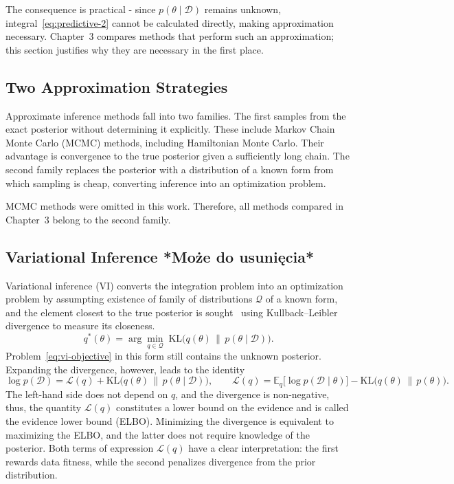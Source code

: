 The consequence is practical - since $p(\theta \mid \mathcal{D})$ remains unknown,
integral~\eqref{eq:predictive-2} cannot be calculated directly, making approximation
necessary. Chapter~3 compares methods that perform such an approximation; this section
justifies why they are necessary in the first place.

\subsection{Two Approximation Strategies}
\label{subsec:mcmc-vs-vi}

Approximate inference methods fall into two families. The first samples from the exact
posterior without determining it explicitly. These include Markov Chain Monte Carlo
(MCMC) methods, including Hamiltonian Monte Carlo. Their advantage is convergence to the
true posterior given a sufficiently long chain. The second family replaces the posterior
with a distribution of a known form from which sampling is cheap, converting inference into
an optimization problem.

MCMC methods were omitted in this work. Therefore, all methods compared in Chapter~3 belong to the second
family.

\subsection{Variational Inference *Może do usunięcia*}
\label{subsec:variational-inference}

Variational inference (VI) converts the integration problem into an optimization problem by assumpting existence of family of distributions $\mathcal{Q}$ of a known form, and the element
closest to the true posterior is sought~\cite{blei2017} using Kullback--Leibler divergence to measure its closeness.
%
\begin{equation}
    q^\ast(\theta)
    = \arg\min_{q \in \mathcal{Q}}\;
      \mathrm{KL}\bigl(q(\theta) \,\|\, p(\theta \mid \mathcal{D})\bigr) .
    \label{eq:vi-objective}
\end{equation}
%
Problem~\eqref{eq:vi-objective} in this form still contains the unknown posterior.
Expanding the divergence, however, leads to the identity
%
\begin{equation}
    \log p(\mathcal{D})
    = \mathcal{L}(q) + \mathrm{KL}\bigl(q(\theta) \,\|\, p(\theta \mid \mathcal{D})\bigr),
    \qquad 
    \mathcal{L}(q)
    = \mathbb{E}_{q}\bigl[\log p(\mathcal{D} \mid \theta)\bigr]
      - \mathrm{KL}\bigl(q(\theta) \,\|\, p(\theta)\bigr) .
    \label{eq:elbo}
\end{equation}
%
The left-hand side does not depend on $q$, and the divergence is non-negative, thus, the
quantity $\mathcal{L}(q)$ constitutes a lower bound on the evidence and is called the
evidence lower bound (ELBO). Minimizing the divergence is equivalent to maximizing the
ELBO, and the latter does not require knowledge of the posterior. Both terms of expression
$\mathcal{L}(q)$ have a clear interpretation: the first rewards data fitness, while the second
penalizes divergence from the prior distribution.

